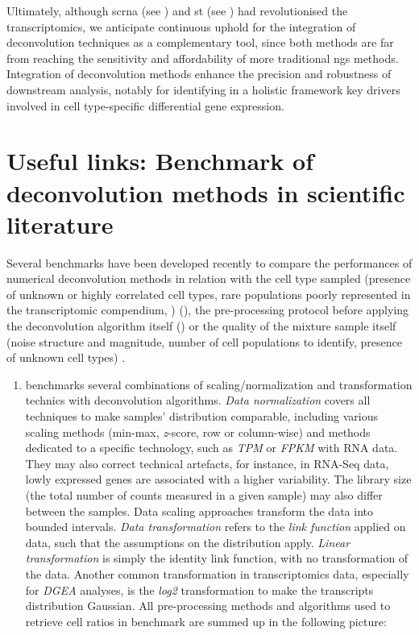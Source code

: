 Ultimately, although \acrfull{scrna} (see ) and \acrfull{st} (see ) had revolutionised the transcriptomics, we anticipate continuous uphold for the integration of deconvolution techniques as a complementary tool, since both methods are far from reaching the sensitivity and affordability of more traditional \acrshort{ngs} methods. Integration of deconvolution methods enhance the precision and robustness of downstream analysis, notably for identifying in a holistic framework key drivers involved in cell type-specific differential gene expression.


\section{Useful links: Benchmark of deconvolution methods in scientific literature}

Several benchmarks have been developed recently to compare the
performances of numerical deconvolution methods in relation with the
cell type sampled (presence of unknown or highly correlated cell types,
rare populations poorly represented in the transcriptomic compendium, )
(\autocite{sturm_etal19}), the
pre-processing protocol before applying the deconvolution algorithm
itself (\autocite{fa_etal20}) or the
quality of the mixture sample itself (noise structure and magnitude,
number of cell populations to identify, presence of unknown cell types)
\autocite{jin_liu21}.

\begin{enumerate}
\def\labelenumi{\arabic{enumi}.}

\item
  \autocite{fa_etal20} benchmarks several
  combinations of scaling/normalization and transformation technics with
  deconvolution algorithms. \emph{Data normalization} covers all
  techniques to make samples' distribution comparable, including various
  scaling methods (min-max, \emph{z}-score, row or column-wise) and
  methods dedicated to a specific technology, such as \emph{TPM} or
  \emph{FPKM} with RNA data. They may also correct technical artefacts,
  for instance, in \acrshort{RNA-Seq} data, lowly expressed genes are associated
  with a higher variability. The library size (the total number of
  counts measured in a given sample) may also differ between the
  samples. Data scaling approaches transform the data into bounded
  intervals. \emph{Data transformation} refers to the \emph{link
  function} applied on data, such that the assumptions on the
  distribution apply. \emph{Linear transformation} is simply the
  identity link function, with no transformation of the data. Another
  common transformation in transcriptomics data, especially for
  \emph{DGEA} analyses, is the \emph{log2} transformation to make the
  transcripts distribution Gaussian. All pre-processing methods and
  algorithms used to retrieve cell ratios in
  \autocite{fa_etal20} benchmark are
  summed up in the following picture:
\end{enumerate}

